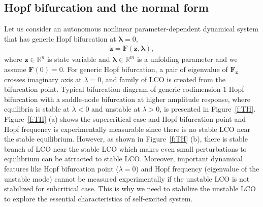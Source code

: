 \documentclass[openacc]{rsproca_new}%
\def\real{\mathbb{R}}
\def\vec#1{\ensuremath{\mathbf{#1}}}
\newcommand{\Fref}[1]{Figure~\ref{#1}}
\begin{document}
\subsection{Hopf bifurcation and the normal form}\label{SNF}

Let us consider an autonomous nonlinear parameter-dependent dynamical system that has generic Hopf bifurcation at \(\vec{\lambda}=0\),
\begin{align}\label{eq:1}
  \dot{\vec{z}} =\vec{F}(\vec{z},\vec{\lambda}),
\end{align}
where \(\vec{z}\in \real^n\) is state variable and \(\vec{\lambda}\in\real^m\) is a unfolding parameter and we assume \(\vec{F}(0)=0\). For generic Hopf bifurcation, a pair of eigenvalue of $\vec{F}_\vec{z}$ crosses imaginary axis at $\lambda=0$, and family of LCO is created from the bifurcation point. Typical bifurcation diagram of generic codimension-1 Hopf bifurcation with a saddle-node bifurcation at higher amplitude response, where equilibria is stable at $\lambda < 0$ and unstable  at $\lambda >0$, is presented in \Fref{f:TH}. \Fref{f:TH} (a) shows the supercritical case and Hopf bifurcation point and Hopf frequency is experimentally measurable since there is no stable LCO near the stable equilibrium. However, as shown in \Fref{f:TH} (b), there is stable branch of LCO near the stable LCO which makes even small perturbations to equilibrium can be atrracted to stable LCO. Moreover, important dynamical features like Hopf bifurcation point ($\lambda=0$) and Hopf frequency (eigenvalue of the unstable mode) cannot be measured experimentally if the unstable LCO is not stabilized for subcritical case. This is why we need to stabilize the unstable LCO to explore the essential characteristics of self-excited system.
\end{document}
